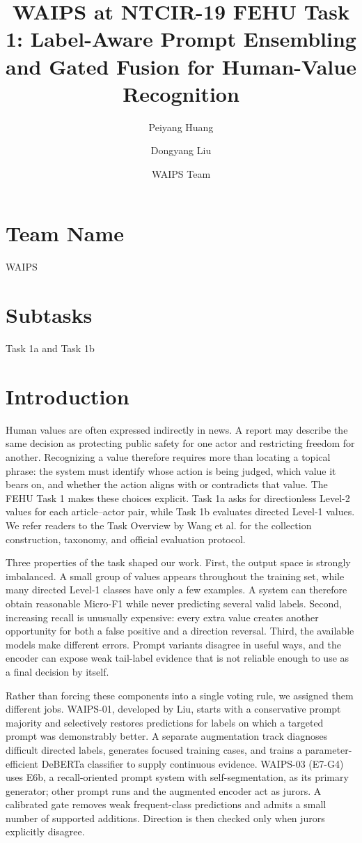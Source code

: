 \documentclass[sigconf,article,a4paper]{acmart}
\title{WAIPS at NTCIR-19 FEHU Task 1: Label-Aware Prompt Ensembling and Gated Fusion for Human-Value Recognition}
\author{Peiyang Huang}
\affiliation{%
  \institution{Affiliation to be confirmed}
  \country{China}}
\author{Dongyang Liu}
\affiliation{%
  \institution{Affiliation to be confirmed}
  \country{China}}
\author{WAIPS Team}
\affiliation{%
  \institution{Additional authors to be confirmed}
  \country{China}}
\begin{document}
\maketitle
\pagestyle{plain}

\section*{Team Name}
WAIPS

\section*{Subtasks}
Task 1a and Task 1b

\section{Introduction}

Human values are often expressed indirectly in news. A report may describe the
same decision as protecting public safety for one actor and restricting freedom
for another. Recognizing a value therefore requires more than locating a
topical phrase: the system must identify whose action is being judged, which
value it bears on, and whether the action aligns with or contradicts that
value. The FEHU Task 1 makes these choices explicit. Task 1a asks for
directionless Level-2 values for each article--actor pair, while Task 1b
evaluates directed Level-1 values. We refer readers to the Task Overview by
Wang et al. for the collection construction, taxonomy, and official evaluation
protocol.

Three properties of the task shaped our work. First, the output space is
strongly imbalanced. A small group of values appears throughout the training
set, while many directed Level-1 classes have only a few examples. A system can
therefore obtain reasonable Micro-F1 while never predicting several valid
labels. Second, increasing recall is unusually expensive: every extra value
creates another opportunity for both a false positive and a direction
reversal. Third, the available models make different errors. Prompt variants
disagree in useful ways, and the encoder can expose weak tail-label evidence
that is not reliable enough to use as a final decision by itself.

Rather than forcing these components into a single voting rule, we assigned
them different jobs. WAIPS-01, developed by Liu, starts with a conservative
prompt majority and selectively restores predictions for labels on which a
targeted prompt was demonstrably better. A separate augmentation track
diagnoses difficult directed labels, generates focused training cases, and
trains a parameter-efficient DeBERTa classifier to supply continuous evidence.
WAIPS-03 (E7-G4) uses E6b, a recall-oriented prompt system with
self-segmentation, as its primary generator; other prompt runs and the
augmented encoder act as jurors.
A calibrated gate removes weak frequent-class predictions and admits a small
number of supported additions. Direction is then checked only when jurors
explicitly disagree.
\end{document}
